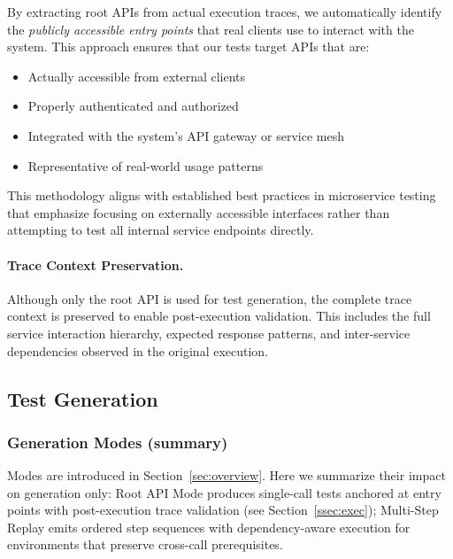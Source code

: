 \documentclass[conference]{IEEEtran}
\begin{document}
By extracting root APIs from actual execution traces, we automatically identify the \emph{publicly accessible entry points} that real clients use to interact with the system. This approach ensures that our tests target APIs that are:
\begin{itemize}[leftmargin=*]
\item Actually accessible from external clients
\item Properly authenticated and authorized
\item Integrated with the system's API gateway or service mesh
\item Representative of real-world usage patterns
\end{itemize}

This methodology aligns with established best practices in microservice testing that emphasize focusing on externally accessible interfaces rather than attempting to test all internal service endpoints directly.

\paragraph{Trace Context Preservation.}
Although only the root API is used for test generation, the complete trace context is preserved to enable post-execution validation. This includes the full service interaction hierarchy, expected response patterns, and inter-service dependencies observed in the original execution.

\subsection{Test Generation}
\label{ssec:gen}

\subsubsection*{Generation Modes (summary)}\label{ssec:gen-modes}
Modes are introduced in Section~\ref{sec:overview}. Here we summarize their impact on generation only: Root API Mode produces single-call tests anchored at entry points with post-execution trace validation (see Section~\ref{ssec:exec}); Multi-Step Replay emits ordered step sequences with dependency-aware execution for environments that preserve cross-call prerequisites.
\end{document}
